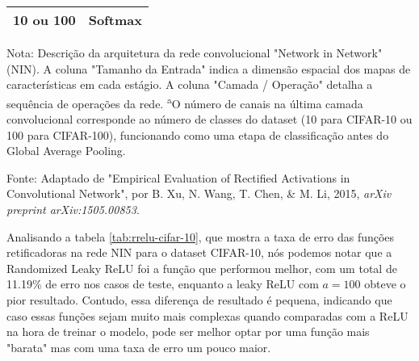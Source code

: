 \begin{table}[ht]
\begin{threeparttable}
\begin{tabular}{ll}
            10 ou 100 & Softmax \\
            
            \bottomrule
        \end{tabular}
        
        \begin{tablenotes}[para]
            \small
            \item[] Nota: Descrição da arquitetura da rede convolucional "Network in Network" (NIN). A coluna "Tamanho da Entrada" indica a dimensão espacial dos mapas de características em cada estágio. A coluna "Camada / Operação" detalha a sequência de operações da rede. \textsuperscript{a}O número de canais na última camada convolucional corresponde ao número de classes do dataset (10 para CIFAR-10 ou 100 para CIFAR-100), funcionando como uma etapa de classificação antes do Global Average Pooling.
            \item[] Fonte: Adaptado de "Empirical Evaluation of Rectified Activations in Convolutional Network", por B. Xu, N. Wang, T. Chen, \& M. Li, 2015, \textit{arXiv preprint arXiv:1505.00853}.
        \end{tablenotes}
        
    \end{threeparttable}
\end{table}

Analisando a tabela \ref{tab:rrelu-cifar-10}, que mostra a taxa de erro das funções retificadoras na rede NIN para o dataset CIFAR-10, nós podemos notar que a Randomized Leaky ReLU foi a função que performou melhor, com um total de 11.19\% de erro nos casos de teste, enquanto a leaky ReLU com $a = 100$ obteve o pior resultado. Contudo, essa diferença de resultado é pequena, indicando que caso essas funções sejam muito mais complexas quando comparadas com a ReLU na hora de treinar o modelo, pode ser melhor optar por uma função mais "barata" mas com uma taxa de erro um pouco maior.

